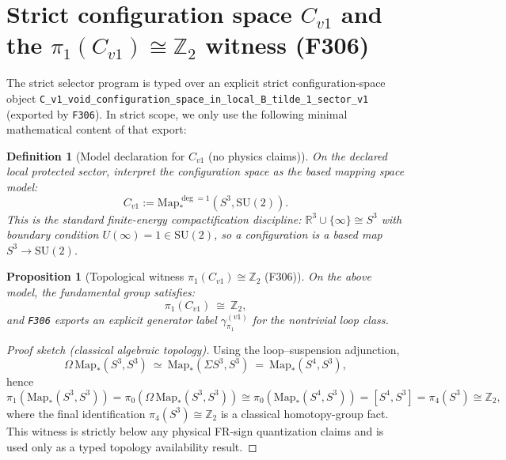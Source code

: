 \documentclass[11pt,a4paper]{article}
\makeatletter
\newtheorem{proposition}[theorem]{Proposition}
\newtheorem{definition}{Definition}[section]
\newcommand{\chapter}{\@ifstar{\section*}{\section}}
\makeatother
\begin{document}
\chapter{Selector closure on \texorpdfstring{$C_{v1}$}{C\_v1}}
\section{Strict configuration space \texorpdfstring{$C_{v1}$}{C\_v1} and the \texorpdfstring{$\pi_1(C_{v1})\cong\mathbb{Z}_2$}{pi1(C\_v1)=Z2} witness (F306)}

The strict selector program is typed over an explicit strict configuration-space object \texttt{C\_v1\_void\_configuration\_space\_in\_local\_B\_tilde\_1\_sector\_v1} (exported by \texttt{F306}).
In strict scope, we only use the following minimal mathematical content of that export:

\begin{definition}[Model declaration for $C_{v1}$ (no physics claims)]
On the declared local protected sector, interpret the configuration space as the based mapping space model:
\[
C_{v1} := \mathrm{Map}_*^{\deg=1}\!\left(S^3,\mathrm{SU}(2)\right).
\]
This is the standard finite-energy compactification discipline:
$\mathbb{R}^3\cup\{\infty\}\cong S^3$ with boundary condition $U(\infty)=1\in \mathrm{SU}(2)$, so a configuration is a based map $S^3\to \mathrm{SU}(2)$.
\end{definition}

\begin{proposition}[Topological witness $\pi_1(C_{v1})\cong\mathbb{Z}_2$ (F306)]
On the above model, the fundamental group satisfies:
\[
\pi_1(C_{v1})\ \cong\ \mathbb{Z}_2,
\]
and \texttt{F306} exports an explicit generator label $\gamma_{\pi_1}^{(v1)}$ for the nontrivial loop class.
\end{proposition}

\begin{proof}[Proof sketch (classical algebraic topology)]
Using the loop--suspension adjunction,
\[
\Omega\,\mathrm{Map}_*(S^3,S^3)\ \simeq\ \mathrm{Map}_*(\Sigma S^3,S^3)\ =\ \mathrm{Map}_*(S^4,S^3),
\]
hence
\[
\pi_1\!\left(\mathrm{Map}_*(S^3,S^3)\right)
=\pi_0\!\left(\Omega\,\mathrm{Map}_*(S^3,S^3)\right)
\cong \pi_0\!\left(\mathrm{Map}_*(S^4,S^3)\right)
=[S^4,S^3]
=\pi_4(S^3)
\cong \mathbb{Z}_2,
\]
where the final identification $\pi_4(S^3)\cong \mathbb{Z}_2$ is a classical homotopy-group fact.
This witness is strictly below any physical FR-sign quantization claims and is used only as a typed topology availability result.
\end{proof}
\end{document}
